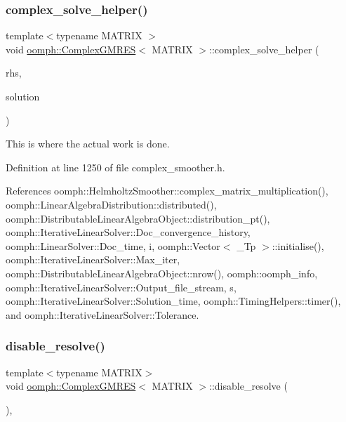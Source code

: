 \subsubsection{\texorpdfstring{complex\+\_\+solve\+\_\+helper()}{complex\_solve\_helper()}}
{\footnotesize\ttfamily template$<$typename M\+A\+T\+R\+IX $>$ \\
void \hyperlink{classoomph_1_1ComplexGMRES}{oomph\+::\+Complex\+G\+M\+R\+ES}$<$ M\+A\+T\+R\+IX $>$\+::complex\+\_\+solve\+\_\+helper (\begin{DoxyParamCaption}\item[{const \hyperlink{classoomph_1_1Vector}{Vector}$<$ \hyperlink{classoomph_1_1DoubleVector}{Double\+Vector} $>$ \&}]{rhs,  }\item[{\hyperlink{classoomph_1_1Vector}{Vector}$<$ \hyperlink{classoomph_1_1DoubleVector}{Double\+Vector} $>$ \&}]{solution }\end{DoxyParamCaption})\hspace{0.3cm}{\ttfamily [private]}}



This is where the actual work is done. 



Definition at line 1250 of file complex\+\_\+smoother.\+h.



References oomph\+::\+Helmholtz\+Smoother\+::complex\+\_\+matrix\+\_\+multiplication(), oomph\+::\+Linear\+Algebra\+Distribution\+::distributed(), oomph\+::\+Distributable\+Linear\+Algebra\+Object\+::distribution\+\_\+pt(), oomph\+::\+Iterative\+Linear\+Solver\+::\+Doc\+\_\+convergence\+\_\+history, oomph\+::\+Linear\+Solver\+::\+Doc\+\_\+time, i, oomph\+::\+Vector$<$ \+\_\+\+Tp $>$\+::initialise(), oomph\+::\+Iterative\+Linear\+Solver\+::\+Max\+\_\+iter, oomph\+::\+Distributable\+Linear\+Algebra\+Object\+::nrow(), oomph\+::oomph\+\_\+info, oomph\+::\+Iterative\+Linear\+Solver\+::\+Output\+\_\+file\+\_\+stream, s, oomph\+::\+Iterative\+Linear\+Solver\+::\+Solution\+\_\+time, oomph\+::\+Timing\+Helpers\+::timer(), and oomph\+::\+Iterative\+Linear\+Solver\+::\+Tolerance.

\mbox{\label{classoomph_1_1ComplexGMRES_a07db774f0aca4e71579c7c071e25a451}} 
\subsubsection{\texorpdfstring{disable\+\_\+resolve()}{disable\_resolve()}}
{\footnotesize\ttfamily template$<$typename M\+A\+T\+R\+IX$>$ \\
void \hyperlink{classoomph_1_1ComplexGMRES}{oomph\+::\+Complex\+G\+M\+R\+ES}$<$ M\+A\+T\+R\+IX $>$\+::disable\+\_\+resolve (\begin{DoxyParamCaption}{ }\end{DoxyParamCaption})\hspace{0.3cm}{\ttfamily [inline]}, {\ttfamily [virtual]}}



